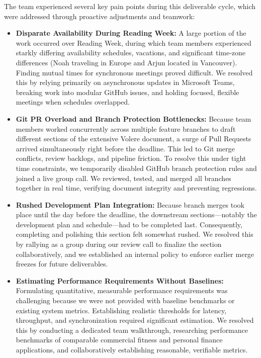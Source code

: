 \documentclass[12pt]{article}
\begin{document}
\begin{enumerate}
  The team experienced several key pain points during this deliverable cycle, which were addressed through proactive adjustments and teamwork:
  \begin{itemize}
    \item \textbf{Disparate Availability During Reading Week:} A large portion of the work occurred over Reading Week, during which team members experienced starkly differing availability schedules, vacations, and significant time-zone differences (Noah traveling in Europe and Arjun located in Vancouver). Finding mutual times for synchronous meetings proved difficult. We resolved this by relying primarily on asynchronous updates in Microsoft Teams, breaking work into modular GitHub issues, and holding focused, flexible meetings when schedules overlapped.
    \item \textbf{Git PR Overload and Branch Protection Bottlenecks:} Because team members worked concurrently across multiple feature branches to draft different sections of the extensive Volere document, a surge of Pull Requests arrived simultaneously right before the deadline. This led to Git merge conflicts, review backlogs, and pipeline friction. To resolve this under tight time constraints, we temporarily disabled GitHub branch protection rules and joined a live group call. We reviewed, tested, and merged all branches together in real time, verifying document integrity and preventing regressions.
    \item \textbf{Rushed Development Plan Integration:} Because branch merges took place until the day before the deadline, the downstream sections---notably the development plan and schedule---had to be completed last. Consequently, completing and polishing this section felt somewhat rushed. We resolved this by rallying as a group during our review call to finalize the section collaboratively, and we established an internal policy to enforce earlier merge freezes for future deliverables.
    \item \textbf{Estimating Performance Requirements Without Baselines:} Formulating quantitative, measurable performance requirements was challenging because we were not provided with baseline benchmarks or existing system metrics. Establishing realistic thresholds for latency, throughput, and synchronization required significant estimation. We resolved this by conducting a dedicated team walkthrough, researching performance benchmarks of comparable commercial fitness and personal finance applications, and collaboratively establishing reasonable, verifiable metrics.
  \end{itemize}


\end{enumerate}
\end{document}
